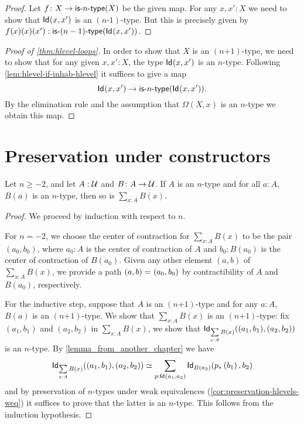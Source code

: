 \begin{proof}
  Let $f \colon X \to \istype{n}(X)$ be the given map. For any $x, x' : X$ we need to show that
     $\idtype{x}{x'}$ is an $(n \mbox{-} 1)$-type. But this is precisely given by
    $f(x)(x)(x') : \istype{(n-1)}(\idtype{x}{x'}) $.
\end{proof}


\begin{proof}[Proof of \autoref{thm:hlevel-loops}]
 In order to show that $X$ is an $(n\mbox{+}1)$-type, we need to show that for any given $x, x' : X$,
   the type $\idtype{x}{x'}$ is an $n$-type.
  Following \autoref{lem:hlevel-if-inhab-hlevel} it suffices to give a map
   \[ \idtype{x}{x'} \to \istype{n}(\idtype{x}{x'})  .\]
  By the elimination rule and the assumption that $\Omega(X, x)$ is an $n$-type we obtain this map.
\end{proof}

\section{Preservation under constructors}

\begin{thm}
 Let $n \geq -2$, and let $A : \type$ and $B \colon A \to \type$.
 If $A$ is an $n$-type and for all $a : A$, $B(a)$ is an $n$-type, then so is $\sum\limits_{x : A} B(x)$.
\end{thm}

\begin{proof}
 We proceed by induction with respect to $n$.

 For $n = -2$, we choose the center of contraction for $\sum\limits_{x : A} B(x)$ to be the pair
       $(a_0, b_0)$, where $a_0 : A$ is the center of contraction of $A$ and $b_0 : B(a_0)$ is the center of contraction of $B(a_0)$.
       Given any other element $(a,b)$ of $\sum\limits_{x : A} B(x)$, we provide a path $\id{(a, b)}{(a_0,b_0)}$
       by contractibility of $A$ and $B(a_0)$, respectively.

 For the inductive step, suppose that $A$ is an $(n\mbox{+}1)$-type and
         for any $a : A$, $B(a)$ is an $(n \mbox{+} 1)$-type. We show that $\sum\limits_{x : A} B(x)$ is an $(n \mbox{+} 1)$-type:
      fix $(a_1, b_1)$ and $(a_2,b_2)$ in $\sum\limits_{x : A} B(x)$,
     we show that $\idtype[\sum\limits_{x : A} B(x)]{(a_1, b_1)}{(a_2,b_2)}$ is an $n$-type.
      By \autoref{lemma_from_another_chapter} we have
      \[ \eqv{\idtype[\sum\limits_{x : A} B(x)]{(a_1, b_1)}{(a_2,b_2)}}{\sum_{p : \idtype{a_1}{a_2}} \idtype[B(a_2)]{\trans{p}{b_1}}{b_2}} \]
   and by preservation of $n$-types under weak equivalences (\autoref{cor:preservation-hlevels-weq})
   it suffices to prove that the latter is an $n$-type. This follows from the
   induction hypothesis.
\end{proof}


